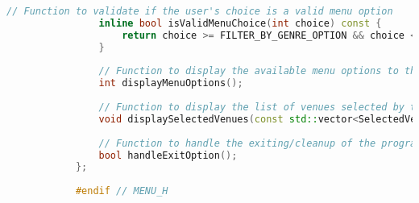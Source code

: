 \documentclass{article}
\begin{document}
\begin{mdframed}[backgroundcolor=background, hidealllines=false, innerleftmargin=15pt, innerrightmargin=5pt, innertopmargin=0pt, innerbottommargin=-5pt, linecolor=accent]
\begin{lstlisting}[language=C++]
				// Function to validate if the user's choice is a valid menu option
				inline bool isValidMenuChoice(int choice) const {
					return choice >= FILTER_BY_GENRE_OPTION && choice <= EXIT_OPTION;
				}
				
				// Function to display the available menu options to the user
				int displayMenuOptions();
				
				// Function to display the list of venues selected by the user
				void displaySelectedVenues(const std::vector<SelectedVenue>& selectedVenues);
				
				// Function to handle the exiting/cleanup of the program
				bool handleExitOption();
			};
			
			#endif // MENU_H
		\end{lstlisting}
	\end{mdframed}
	
\end{document}
